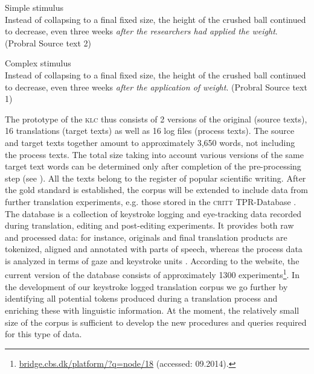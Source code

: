 \documentclass[output=paper]{LSP/langsci}
\begin{document}
\ea \label{ex:1:1} Simple stimulus\\
Instead of collapsing to a final fixed size, the height of the crushed ball continued to decrease, even three weeks \emph{after the researchers had applied the weight}. (Probral Source text 2)
\z

\ea \label{ex:1:2}
Complex stimulus\\
Instead of collapsing to a final fixed size, the height of the crushed ball continued to decrease, even three weeks \emph{after the application of weight}. (Probral Source text 1)
\z

The prototype of the \textsc{klc} thus consists of 2 versions of the original (source texts), 16 translations (target texts) as well as 16 log files (process texts). The source and target texts together amount to approximately 3,650 words, not including the process texts. The total size taking into account various versions of the same target text words can be determined only after completion of the pre-processing step (see ). All the texts belong to the register of popular scientific writing. After the gold standard is established, the corpus will be extended to include data from further translation experiments, e.g. those stored in the \textsc{critt} \textsc{TPR}-Database \citep{Carl2012}. The database is a collection of keystroke logging and eye-tracking data recorded during translation, editing and post-editing experiments. It provides both raw and processed data: for instance, originals and final translation products are tokenized, aligned and annotated with parts of speech, whereas the process data is analyzed in terms of gaze and keystroke units \citep{Carl2012}. According to the website, the current version of the database consists of approximately 1300 experiments\footnote{\url{bridge.cbs.dk/platform/?q=node/18} (accessed: 09.2014).}. In the development of our keystroke logged translation corpus we go further by identifying all potential tokens produced during a translation process and enriching these with linguistic information. At the moment, the relatively small size of the corpus is sufficient to develop the new procedures and queries required for this type of data. 
\end{document}

